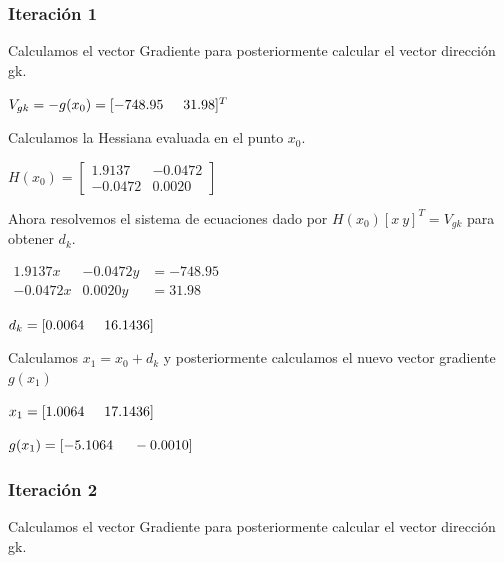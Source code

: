 \documentclass[12pt]{article}
\begin{document}
\subsubsection*{Iteración 1}
		
		Calculamos el vector Gradiente para posteriormente calcular el vector dirección gk.
		
		\begin{center}
			$V_{gk}=-g(x_0)=[-748.95\hspace{0.5cm} 31.98]^T$			
		\end{center}
	
		Calculamos la Hessiana evaluada en el punto $x_0$.
		
		\begin{center}
			$H(x_0)=\left[\begin{array}{cc}
				1.9137 & -0.0472\\
				-0.0472 & 0.0020
				\end{array}\right]$		
		\end{center}
	
		Ahora resolvemos el sistema de ecuaciones dado por $H(x_0)[x\ y]^T=V_{gk}$ para obtener $d_k$.
		
		\begin{center}
			$\begin{array}{ccc}
			1.9137x & -0.0472y & =-748.95\\
			-0.0472x & 0.0020y & =31.98
		\end{array}$
	
		$d_k=[0.0064\hspace{0.5cm}16.1436]$
		\end{center}	
		
		Calculamos $x_1=x_0+d_k$ y posteriormente calculamos el nuevo vector gradiente $g(x_1)$
		
		\begin{center}
			$x_1=[1.0064\hspace{0.5cm}17.1436]$
			
			$g(x_1)=[-5.1064\hspace{0.5cm}-0.0010]$
		\end{center}
	
	
	
        \subsubsection*{Iteración 2}
	
	Calculamos el vector Gradiente para posteriormente calcular el vector dirección gk.
	
\end{document}
